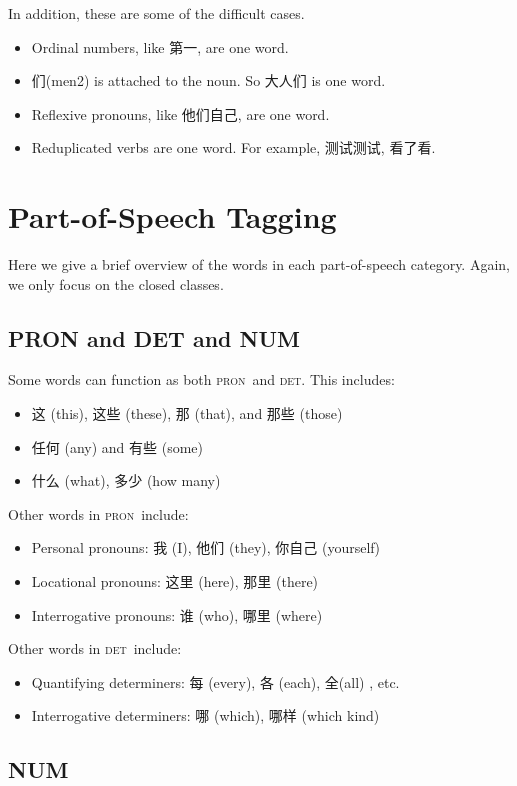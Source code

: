 \documentclass[UTF8,oneside]{book}
\def\pron{\textsc{pron}}
\def\det{\textsc{det}}
\begin{document}
In addition, these are some of the difficult cases.

\begin{itemize}
\item Ordinal numbers, like 第一, are one word. 
\item 们(men2) is attached to the noun. So 大人们 is one word.
\item Reflexive pronouns, like 他们自己, are one word. 
\item Reduplicated verbs are one word. For example, 测试测试, 看了看.
\end{itemize}


\chapter{Part-of-Speech Tagging}

Here we give a brief overview of the words in each part-of-speech category. Again, we only focus on the closed classes. 


\section{PRON and DET and NUM}
Some words can function as both \pron\ and \det. This includes:
\begin{itemize}
\item 
{}
这 (this), 这些 (these), 那 (that), and 那些 (those)
\item 任何 (any) and 有些 (some)
\item 什么 (what),  多少 (how many)
\end{itemize}

Other words in \pron\ include:
\begin{itemize}
\item Personal pronouns: 我 (I), 他们 (they), 你自己 (yourself)
\item Locational pronouns: 这里 (here), 那里 (there)
\item Interrogative pronouns: 谁 (who), 哪里 (where)
\end{itemize}

Other words in \det\ include:
\begin{itemize}
\item Quantifying determiners: 每 (every), 各 (each), 全(all) , etc.
\item Interrogative determiners: 哪 (which), 哪样 (which kind)
\end{itemize}

\section{NUM}
\end{document}
